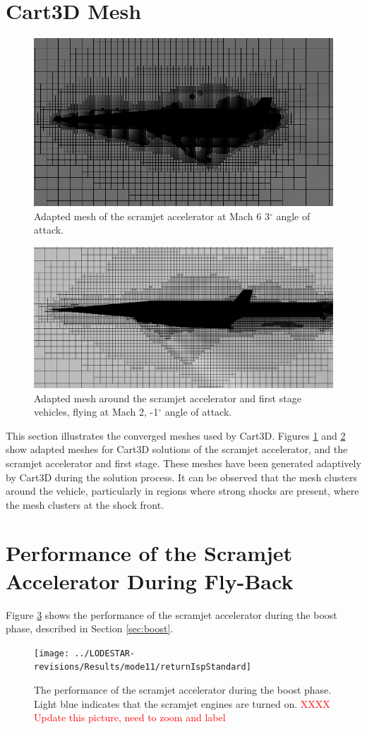 \section{Cart3D Mesh}
\begin{figure}[ht]
	\centering
	\includegraphics[width=0.7\linewidth]{figures/3_vehicle_design/M3AoA6GRID}
	\caption{Adapted mesh of the scramjet accelerator at Mach 6 3$^\circ$ angle of attack.}
	\label{fig:M3AoA6GRID}
\end{figure}

\begin{figure}[ht]
	\centering
	\includegraphics[width=0.7\linewidth]{figures/3_vehicle_design/CARTmesh}
	\caption{Adapted mesh around the scramjet accelerator and first stage vehicles, flying at Mach 2, -1$^\circ$ angle of attack.}
	\label{fig:CARTmesh}
\end{figure}
This section illustrates the converged meshes used by Cart3D.
Figures \ref{fig:M3AoA6GRID} and \ref{fig:CARTmesh} show adapted meshes for Cart3D solutions of the scramjet accelerator, and the scramjet accelerator and first stage. These meshes have been generated adaptively by Cart3D during the solution process. It can be observed that the mesh clusters around the vehicle, particularly in regions where strong shocks are present, where the mesh clusters at the shock front. 
\FloatBarrier
\section{Performance of the Scramjet Accelerator During Fly-Back}
Figure \ref{fig:returnIspStandard} shows the performance of the scramjet accelerator during the boost phase, described in Section \ref{sec:boost}. 
\begin{figure}[ht]
	\centering
	\texttt{[image: ../LODESTAR-revisions/Results/mode11/returnIspStandard]}
	\caption{The performance of the scramjet accelerator during the boost phase. Light blue indicates that the scramjet engines are turned on. \textcolor{red}{XXXX Update this picture, need to zoom and label}}
	\label{fig:returnIspStandard}
\end{figure}

